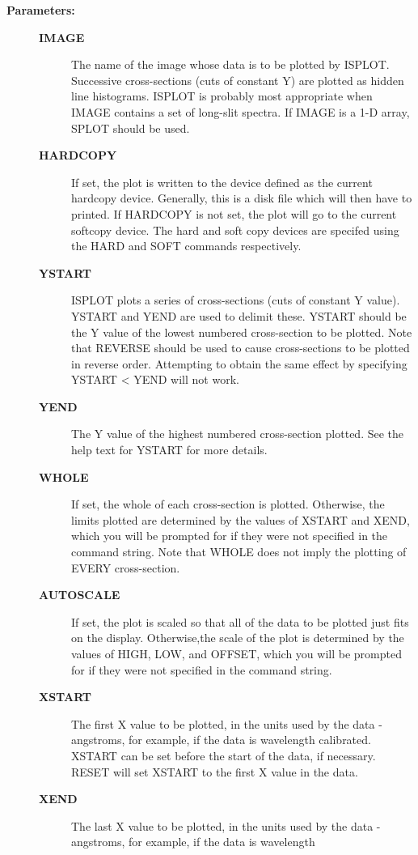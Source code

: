 \begin{description}
\begin{description}
\item [\textbf{Parameters:}]
\begin{description}
\item [\textbf{IMAGE}]
 The name of the image whose data is to be plotted by ISPLOT.
 Successive cross-sections (cuts of constant Y) are plotted as hidden
 line histograms.  ISPLOT is probably most appropriate when IMAGE
 contains a set of long-slit spectra.  If IMAGE is a 1-D array, SPLOT
 should be used.
\item [\textbf{HARDCOPY}]
 If set, the plot is written to the device defined as the
 current hardcopy device.  Generally, this is a disk file
 which will then have to printed.  If HARDCOPY is not set,
 the plot will go to the current softcopy device.  The hard
 and soft copy devices are specifed using the HARD and SOFT
 commands respectively.
\item [\textbf{YSTART}]
 ISPLOT plots a series of cross-sections (cuts of constant Y value).
 YSTART and YEND are used to delimit these.  YSTART should be the Y
 value of the lowest numbered cross-section to be plotted.  Note that
 REVERSE should be used to cause cross-sections to be plotted in
 reverse order.  Attempting to obtain the same effect by specifying
 YSTART < YEND will not work.
\item [\textbf{YEND}]
 The Y value of the highest numbered cross-section plotted.
 See the help text for YSTART for more details.
\item [\textbf{WHOLE}]
 If set, the whole of each cross-section is plotted.
 Otherwise, the limits plotted are determined by the values of XSTART
 and XEND, which you will be prompted for if they were not specified
 in the command string.  Note that WHOLE does not imply the plotting
 of EVERY cross-section.
\item [\textbf{AUTOSCALE}]
 If set, the plot is scaled so that all of the data to be plotted
 just fits on the display.  Otherwise,the scale of the plot is
 determined by the values of HIGH, LOW, and OFFSET, which you
 will be prompted for if they were not specified in the command
 string.
\item [\textbf{XSTART}]
 The first X value to be plotted, in the units used
 by the data - angstroms, for example, if the data is wavelength
 calibrated.  XSTART can be set before the start of the data, if
 necessary.  RESET will set XSTART to the first X value in the data.
\item [\textbf{XEND}]
 The last X value to be plotted, in the units used by
 the data - angstroms, for example, if the data is wavelength

\end{description}
\end{description}
\end{description}

